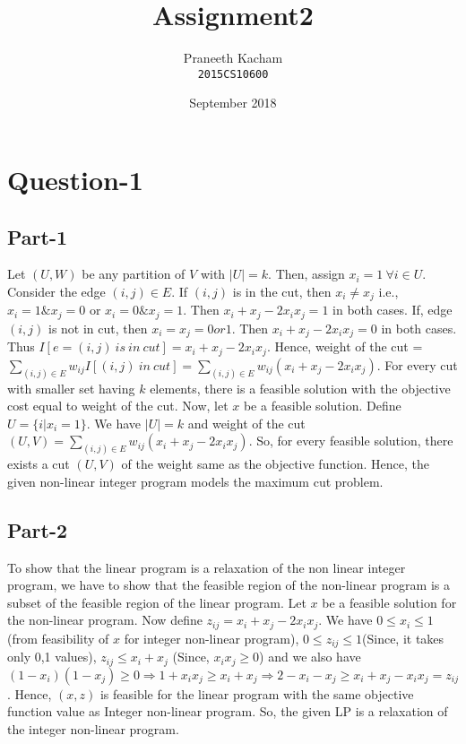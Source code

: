 \documentclass{article}
\title{Assignment2}
\author{Praneeth Kacham\\ \texttt{2015CS10600}}
\date{September 2018}
\newcommand{\set}[1]{\{#1\}}
\begin{document}
\maketitle
\section{Question-1}
\subsection{Part-1}
Let $(U,W)$ be any partition of $V$ with $|U| = k$. Then, assign $x_i = 1\ \forall i \in U$. Consider the edge $(i,j) \in E$. If $(i,j)$ is in the cut, then $x_i \ne x_j$ i.e., $x_i = 1 \& x_j = 0$ or $x_i = 0 \& x_j = 1$. Then $x_i + x_j - 2x_ix_j = 1$ in both cases. If, edge $(i,j)$ is not in cut, then $x_i = x_j = 0 or 1$. Then $x_i + x_j - 2x_ix_j = 0$ in both cases. Thus $I[e = (i,j)\ is\ in\ cut] = x_i+x_j - 2x_ix_j$. Hence, weight of the cut = $\sum_{(i,j) \in E}w_{ij}I[(i,j)\ in\ cut] = \sum_{(i,j)\in E} w_{ij}(x_i + x_j - 2x_ix_j)$. For every cut with smaller set having $k$ elements, there is a feasible solution with the objective cost equal to weight of the cut. Now, let $x$ be a feasible solution. Define $U = \set{i | x_i = 1}$. We have $|U| = k$ and weight of the cut $(U,V) = \sum_{(i,j) \in E}w_{ij}(x_i + x_j - 2x_ix_j)$. So, for every feasible solution, there exists a cut $(U,V)$ of the weight same as the objective function. Hence, the given non-linear integer program models the maximum cut problem.

\subsection{Part-2}
To show that the linear program is a relaxation of the non linear integer program, we have to show that the feasible region of the non-linear program is a subset of the feasible region of the linear program. Let $x$ be a feasible solution for the non-linear program. Now define $z_{ij} = x_i + x_j - 2x_ix_j$. We have $0 \le x_i \le 1$ (from feasibility of $x$ for integer non-linear program), $0 \leq z_{ij} \leq 1$(Since, it takes only 0,1 values),  $z_{ij} \le x_i + x_j$ (Since, $x_ix_j \ge 0$) and we also have $(1 - x_i)(1 - x_j) \geq 0 \Rightarrow 1 + x_ix_j \geq x_i + x_j \Rightarrow 2 - x_i - x_j \geq x_i + x_j - x_ix_j = z_{ij}$. Hence, $(x,z)$ is feasible for the linear program with the same objective function value as Integer non-linear program. So, the given LP is a relaxation of the integer non-linear program.
\end{document}
